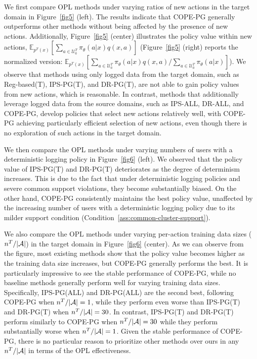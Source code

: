 \documentclass{article} %
\theoremstyle{definition}
\begin{document}
We first compare OPL methods under varying ratios of new actions in the target domain in Figure~\ref{fig5} (left). The results indicate that COPE-PG generally outperforms other methods without being affected by the presence of new actions. Additionally, Figure~\ref{fig5} (center) illustrates the policy value within new actions, $\mathbb{E}_{p^T(x)}[ \sum_{a \in \mathcal{U}_0^T}\pi_{\theta}(a|x)q(x, a)]$ (Figure~\ref{fig5} (right) reports the normalized version: $\mathbb{E}_{p^T(x)}[ \sum_{a \in \mathcal{U}_0^T}\pi_{\theta}(a|x)q(x, a)/\sum_{a \in \mathcal{U}_0^T}\pi_{\theta}(a|x)]$). We observe that methods using only logged data from the target domain, such as Reg-based(T), IPS-PG(T), and DR-PG(T), are not able to gain policy values from new actions, which is reasonable. In contrast, methods that additionally leverage logged data from the source domains, such as IPS-ALL, DR-ALL, and COPE-PG, develop policies that select new actions relatively well, with COPE-PG achieving particularly efficient selection of new actions, even though there is no exploration of such actions in the target domain.

We then compare the OPL methods under varying numbers of users with a deterministic logging policy in Figure~\ref{fig6} (left). We observed that the policy value of IPS-PG(T) and DR-PG(T) deteriorates as the degree of determinism increases. This is due to the fact that under deterministic logging policies and severe common support violations, they become substantially biased. On the other hand, COPE-PG consistently maintains the best policy value, unaffected by the increasing number of users with a deterministic logging policy due to its milder support condition (Condition~\ref{ass:common-cluster-support}).

We also compare the OPL methods under varying per-action training data sizes ($n^T/|\mathcal{A}|$) in the target domain in Figure~\ref{fig6} (center). As we can observe from the figure, most existing methods show that the policy value becomes higher as the training data size increases, but COPE-PG generally performs the best. It is particularly impressive to see the stable performance of COPE-PG, while no baseline methods generally perform well for varying training data sizes. Specifically, IPS-PG(ALL) and DR-PG(ALL) are the second best, following COPE-PG when $n^T/|\mathcal{A}| = 1$, while they perform even worse than IPS-PG(T) and DR-PG(T) when $n^T/|\mathcal{A}| = 30$. In contrast, IPS-PG(T) and DR-PG(T) perform similarly to COPE-PG when $n^T/|\mathcal{A}| = 30$ while they perform substantially worse when $n^T/|\mathcal{A}| = 1$. Given the stable performance of COPE-PG, there is no particular reason to prioritize other methods over ours in any $n^T/|\mathcal{A}|$ in terms of the OPL effectiveness.
\end{document}
